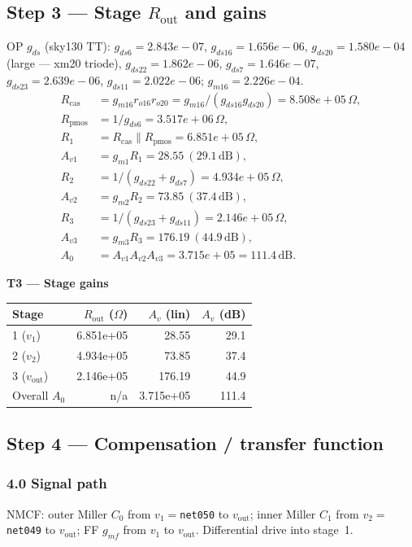 \documentclass[11pt]{article}
\begin{document}
\subsection{Step 3 --- Stage $R_{\mathrm{out}}$ and gains}
OP $g_{ds}$ (sky130 TT):
$g_{ds6}{=}2.843e-07$,
$g_{ds16}{=}1.656e-06$,
$g_{ds20}{=}1.580e-04$ (large --- xm20 triode),
$g_{ds22}{=}1.862e-06$,
$g_{ds7}{=}1.646e-07$,
$g_{ds23}{=}2.639e-06$,
$g_{ds11}{=}2.022e-06$;
$g_{m16}{=}2.226e-04$.
\begin{align*}
R_{\mathrm{cas}} &= g_{m16} r_{o16} r_{o20}
  = g_{m16}/(g_{ds16} g_{ds20})
  = 8.508e+05\,\Omega,\\
R_{\mathrm{pmos}} &= 1/g_{ds6} = 3.517e+06\,\Omega,\\
R_1 &= R_{\mathrm{cas}}\parallel R_{\mathrm{pmos}} = 6.851e+05\,\Omega,\\
A_{v1} &= g_{m1} R_1 = 28.55\ (29.1\,\mathrm{dB}),\\
R_2 &= 1/(g_{ds22}+g_{ds7}) = 4.934e+05\,\Omega,\\
A_{v2} &= g_{m2} R_2 = 73.85\ (37.4\,\mathrm{dB}),\\
R_3 &= 1/(g_{ds23}+g_{ds11}) = 2.146e+05\,\Omega,\\
A_{v3} &= g_{m3} R_3 = 176.19\ (44.9\,\mathrm{dB}),\\
A_0 &= A_{v1}A_{v2}A_{v3} = 3.715e+05
  = 111.4\,\mathrm{dB}.
\end{align*}

\textbf{T3 --- Stage gains}
\begin{center}
{\small
\begin{tabular}{@{}lrrr@{}}
\toprule
Stage & $R_{\mathrm{out}}$ ($\Omega$) & $A_v$ (lin) & $A_v$ (dB) \\
\midrule
1 ($v_1$) & 6.851e+05 & 28.55 & 29.1 \\
2 ($v_2$) & 4.934e+05 & 73.85 & 37.4 \\
3 ($v_{\mathrm{out}}$) & 2.146e+05 & 176.19 & 44.9 \\
Overall $A_0$ & n/a & 3.715e+05 & 111.4 \\
\bottomrule
\end{tabular}}
\end{center}

\subsection{Step 4 --- Compensation / transfer function}
\subsubsection{4.0 Signal path}
NMCF: outer Miller $C_0$ from $v_1{=}$\texttt{net050} to $v_{\mathrm{out}}$;
inner Miller $C_1$ from $v_2{=}$\texttt{net049} to $v_{\mathrm{out}}$;
FF $g_{mf}$ from $v_1$ to $v_{\mathrm{out}}$. Differential drive into stage~1.
\end{document}
